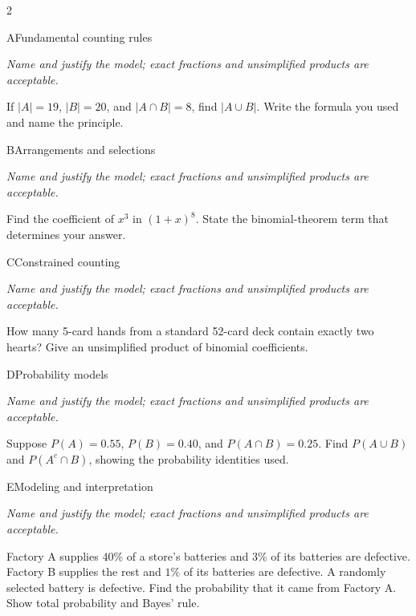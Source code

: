 \documentclass[9pt]{extarticle}
\begin{document}
\FormBreak
{}
\begin{multicols}{2}
\begin{CoreProblem}{A}{Fundamental counting rules}
{\scriptsize\textit{Name and justify the model; exact fractions and unsimplified products are acceptable.}\par}
If $|A|=19$, $|B|=20$, and $|A\cap B|=8$, find $|A\cup B|$. Write
    the formula you used and name the principle.
\end{CoreProblem}
\begin{CoreProblem}{B}{Arrangements and selections}
{\scriptsize\textit{Name and justify the model; exact fractions and unsimplified products are acceptable.}\par}
Find the coefficient of $x^3$ in $(1+x)^8$. State the binomial-theorem
    term that determines your answer.
\end{CoreProblem}
\begin{CoreProblem}{C}{Constrained counting}
{\scriptsize\textit{Name and justify the model; exact fractions and unsimplified products are acceptable.}\par}
How many 5-card hands from a standard 52-card deck contain exactly
    two hearts? Give an unsimplified product of binomial coefficients.
\end{CoreProblem}
\columnbreak
\begin{CoreProblem}{D}{Probability models}
{\scriptsize\textit{Name and justify the model; exact fractions and unsimplified products are acceptable.}\par}
Suppose $P(A)=0.55$, $P(B)=0.40$, and $P(A\cap B)=0.25$. Find
    $P(A\cup B)$ and $P(A^c\cap B)$, showing the probability identities used.
\end{CoreProblem}
\begin{CoreProblem}{E}{Modeling and interpretation}
{\scriptsize\textit{Name and justify the model; exact fractions and unsimplified products are acceptable.}\par}
Factory A supplies $40\%$ of a store's batteries and $3\%$ of its
    batteries are defective. Factory B supplies the rest and $1\%$ of its
    batteries are defective. A randomly selected battery is defective. Find the
    probability that it came from Factory A. Show total probability and Bayes'
    rule.
\end{CoreProblem}
\end{multicols}
\CoreWorkArea
\FormBreak
{}
\end{document}
